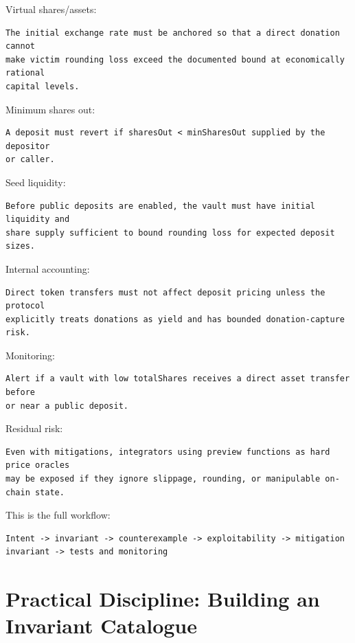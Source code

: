 Virtual shares/assets:

\begin{lstlisting}
The initial exchange rate must be anchored so that a direct donation cannot
make victim rounding loss exceed the documented bound at economically rational
capital levels.
\end{lstlisting}

Minimum shares out:

\begin{lstlisting}
A deposit must revert if sharesOut < minSharesOut supplied by the depositor
or caller.
\end{lstlisting}

Seed liquidity:

\begin{lstlisting}
Before public deposits are enabled, the vault must have initial liquidity and
share supply sufficient to bound rounding loss for expected deposit sizes.
\end{lstlisting}

Internal accounting:

\begin{lstlisting}
Direct token transfers must not affect deposit pricing unless the protocol
explicitly treats donations as yield and has bounded donation-capture risk.
\end{lstlisting}

Monitoring:

\begin{lstlisting}
Alert if a vault with low totalShares receives a direct asset transfer before
or near a public deposit.
\end{lstlisting}

Residual risk:

\begin{lstlisting}
Even with mitigations, integrators using preview functions as hard price oracles
may be exposed if they ignore slippage, rounding, or manipulable on-chain state.
\end{lstlisting}

This is the full workflow:

\begin{lstlisting}
Intent -> invariant -> counterexample -> exploitability -> mitigation invariant -> tests and monitoring
\end{lstlisting}

\section{Practical Discipline: Building an Invariant Catalogue}

